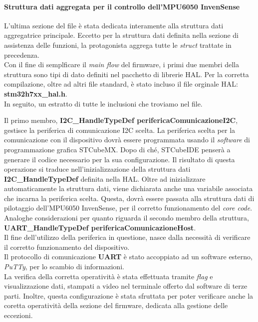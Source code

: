 \documentclass[11pt]{report}
\begin{document}
\paragraph{Struttura dati aggregata per il controllo dell'MPU6050 InvenSense}
L'ultima sezione del file è stata dedicata interamente alla struttura dati aggregatrice principale. Eccetto per la struttura dati definita nella sezione di assistenza delle funzioni, la protagonista aggrega tutte le \textit{struct} trattate in precedenza.\\
Con il fine di semplficare il \textit{main flow} del firmware, i primi due membri della struttura sono tipi di dato definiti nel pacchetto di librerie HAL. Per la corretta compilazione, oltre ad altri file standard,  è stato incluso il file orginale HAL: \textbf{stm32h7xx\_hal.h}.\\
In seguito, un estratto di tutte le inclusioni che troviamo nel file.

Il primo membro, \textbf{I2C\_HandleTypeDef perifericaComunicazioneI2C}, gestisce la periferica di comunicazione I2C scelta. La periferica scelta per la comunicazione con il dispositivo dovrà essere programmata usando il \textit{software} di programmazione grafica STCubeMX.
Dopo di ché, STCubeIDE penserà a generare il codice necessario per la sua configurazione. Il risultato di questa operazione si traduce nell'inizializzazione della struttura dati \textbf{I2C\_HandleTypeDef} definita nella HAL. Oltre ad inizializzare automaticamente la struttura dati, viene dichiarata anche una variabile associata
che incarna la periferica scelta. Questa, dovrà essere passata alla struttura dati di pilotaggio dell'MPU6050 InvenSense, per il corretto funzionamento del \textit{core code}.
Analoghe considerazioni per quanto riguarda il secondo membro della struttura, \textbf{UART\_HandleTypeDef perifericaComunicazioneHost}. 
\\Il fine dell'utilizzo della periferica in questione, nasce dalla necessità di verificare il corretto funzionamento del dispositivo.\\
Il protocollo di comunicazione \textbf{UART} è stato accoppiato ad un software esterno, \textit{PuTTy}, per lo scambio di informazioni.\\
La verifica della corretta operatività è stata effettuata tramite \textit{flag} e visualizzazione dati, stampati a video nel terminale offerto dal software di terze parti. Inoltre, questa configurazione è stata sfruttata per poter verificare anche la coretta operatività della sezione del firmware, dedicata alla gestione delle eccezioni.\\
\end{document}
